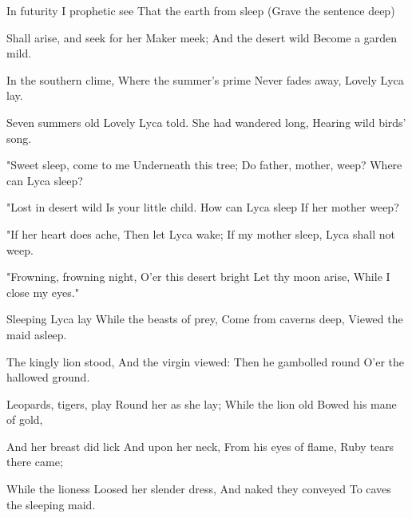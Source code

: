 
\begin{poem}

\begin{stanza}
In futurity\verseline
I prophetic see\verseline
That the earth from sleep\verseline
(Grave the sentence deep)
\end{stanza}
\begin{stanza}
\verseindent Shall arise, and seek\verseline
for her Maker meek;\verseline
And the desert wild\verseline
Become a garden mild.
\end{stanza}
\begin{stanza}
\verseindent In the southern clime,\verseline
Where the summer's prime\verseline
Never fades away,\verseline
Lovely Lyca lay.
\end{stanza}
\begin{stanza}
\verseindent Seven summers old\verseline
Lovely Lyca told.\verseline
She had wandered long,\verseline
Hearing wild birds' song.
\end{stanza}
\begin{stanza}
\verseindent "Sweet sleep, come to me\verseline
Underneath this tree;\verseline
Do father, mother, weep?\verseline
Where can Lyca sleep?
\end{stanza}
\begin{stanza}
\verseindent "Lost in desert wild\verseline
Is your little child.\verseline
How can Lyca sleep\verseline
If her mother weep?
\end{stanza}
\begin{stanza}
\verseindent "If her heart does ache,\verseline
Then let Lyca wake;\verseline
If my mother sleep,\verseline
Lyca shall not weep.
\end{stanza}
\begin{stanza}
\verseindent "Frowning, frowning night,\verseline
O'er this desert bright\verseline
Let thy moon arise,\verseline
While I close my eyes."
\end{stanza}
\begin{stanza}
\verseindent Sleeping Lyca lay\verseline
While the beasts of prey,\verseline
Come from caverns deep,\verseline
Viewed the maid asleep.
\end{stanza}
\begin{stanza}
\verseindent The kingly lion stood,\verseline
And the virgin viewed:\verseline
Then he gambolled round\verseline
O'er the hallowed ground.
\end{stanza}
\begin{stanza}
\verseindent Leopards, tigers, play\verseline
Round her as she lay;\verseline
While the lion old\verseline
Bowed his mane of gold,
\end{stanza}
\begin{stanza}
\verseindent And her breast did lick\verseline
And upon her neck,\verseline
From his eyes of flame,\verseline
Ruby tears there came;
\end{stanza}
\begin{stanza}
\verseindent While the lioness\verseline
Loosed her slender dress,\verseline
And naked they conveyed\verseline
To caves the sleeping maid.
\end{stanza}

\end{poem}
